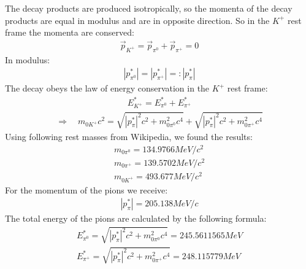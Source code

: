 \documentclass[a4paper,parskip,11pt, DIV12]{scrreprt}
\begin{document}
	The decay products are produced isotropically, so the momenta of the decay products are equal in modulus and are in opposite direction. 
	So in the $K^+$ rest frame the momenta are conserved:
	\begin{align*}
		\overrightarrow{p}_{K^+} = \overrightarrow{p}_{\pi^0} + \overrightarrow{p}_{\pi^+} = 0
	\end{align*}
	In modulus:
	\begin{align*}
		|p^*_{\pi^0}| = |p^*_{\pi^+}| =: |p^*_{\pi}|
	\end{align*}	
	The decay obeys the law of energy conservation in the $K^+$ rest frame:
	\begin{align*}
		E^*_{K^+} = E^*_{\pi^0} + E^*_{\pi^+}
	\end{align*}
	\begin{align*}
	\Rightarrow \quad	m_{0K^+}c^2 = \sqrt{|p^*_{\pi}|^2c^2 + m_{0\pi^0}^2c^4} + \sqrt{|p^*_{\pi}|^2c^2 + m_{0\pi^+}^2c^4}
	\end{align*}	
	Using following rest masses from Wikipedia, we found the results:
	\begin{align*}
		m_{0\pi^0} = 134.9766 MeV/c^2\\
		m_{0\pi^+} = 139.5702 MeV/c^2\\
		m_{0K^+} = 493.677 MeV/c^2
	\end{align*}
	For the momentum of the pions we receive:	
	\begin{align*}
		|p^*_{\pi}| = 205.138 MeV/c
	\end{align*}	
	The total energy of the pions are calculated by the following formula:
	\begin{align*}
		E_{\pi^0}^* = \sqrt{|p^*_{\pi}|^2c^2 + m_{0\pi^0}^2c^4} = 245.5611565 MeV\\
		E_{\pi^+}^* = \sqrt{|p^*_{\pi}|^2c^2 + m_{0\pi^+}^2c^4}= 248.115779 MeV
	\end{align*}
	
	
	\clearpage  
	
	
\end{document}
